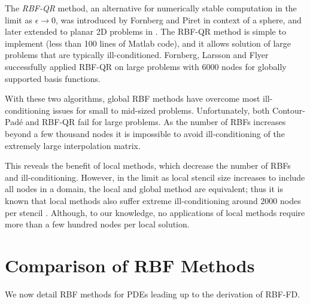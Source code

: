 \documentclass[11pt]{report}
\begin{document}
{The \emph{RBF-QR} method, an alternative for numerically stable computation in the limit as $\epsilon \rightarrow 0$, was introduced by Fornberg  and 
Piret \cite{Fornberg2007} in context of a sphere, and later extended to planar 2D problems in \cite{Fornberg2009b}. The 
RBF-QR 
method is simple 
to implement (less than 100 lines of Matlab code), and it allows solution of large problems that are typically ill-conditioned. Fornberg, Larsson and Flyer \cite{Fornberg2009b} successfully applied RBF-QR on large problems with 6000 nodes for globally supported basis functions. 

With these two algorithms, global RBF methods have overcome most ill-conditioning issues for small to mid-sized problems. Unfortunately, both Contour-Pad\'{e} and RBF-QR fail for large problems.
As the number of RBFs increases beyond a few thousand nodes it is impossible to avoid  ill-conditioning of the extremely large interpolation matrix.

This reveals the benefit of local methods, which decrease the number of RBFs and ill-conditioning. However, in the limit as local stencil size increases to include all nodes in a domain, the local and global method are equivalent; thus it is known that local methods also suffer extreme ill-conditioning around 2000 nodes per stencil \cite{Shu2006}. Although, to our knowledge, no applications of local methods require more than a few hundred nodes per local solution. 

 



%


\section{Comparison of RBF Methods}

We now detail RBF methods for PDEs leading up to the derivation of RBF-FD. 

}
\end{document}
